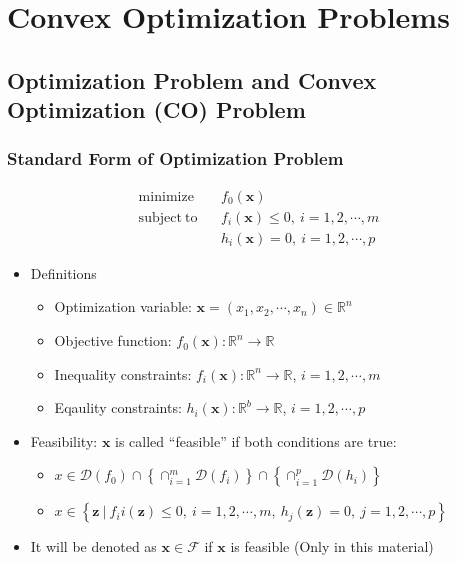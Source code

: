 \section{Convex Optimization Problems}

\subsection{Optimization Problem and Convex Optimization (CO) Problem}

\subsubsection*{Standard Form of Optimization Problem}
$$ \begin{aligned}
    \mathrm{minimize}~~&~~f_0(\mathbf{x}) \\
    \mathrm{subject~to}~~&~~f_i(\mathbf{x}) \leq 0,~i=1,2,\cdots,m \\
        &~~h_i(\mathbf{x}) = 0,~i=1,2,\cdots,p
\end{aligned} $$
\begin{itemize}
    \item Definitions
    \begin{itemize}
        \item Optimization variable: $\mathbf{x} = (x_1,x_2,\cdots,x_n) \in \mathbb{R}^n$
        \item Objective function: $f_0(\mathbf{x}): \mathbb{R}^n \rightarrow \mathbb{R}$
        \item Inequality constraints: $f_i(\mathbf{x}): \mathbb{R}^n \rightarrow \mathbb{R}$, $i=1,2,\cdots,m$
        \item Eqaulity constraints: $h_i(\mathbf{x}): \mathbb{R}^b \rightarrow \mathbb{R}$, $i=1,2,\cdots,p$
    \end{itemize}
    \item Feasibility: $\mathbf{x}$ is called ``feasible'' if both conditions are true:
    \begin{itemize}
        \item $x \in \mathcal{D}(f_0) \cap \left\{ \cap_{i=1}^m \mathcal{D}(f_i) \right\} \cap \left\{ \cap_{i=1}^p \mathcal{D}(h_i) \right\}$
        \item $x \in \left\{ \mathbf{z}~|~f_ii(\mathbf{z}) \leq 0,~i=1,2,\cdots,m,~h_j(\mathbf{z}) = 0,~j=1,2,\cdots,p \right\}$
    \end{itemize}
    \item It will be denoted as $\mathbf{x} \in \mathcal{F}$ if $\mathbf{x}$ is feasible (Only in this material)
\end{itemize}

